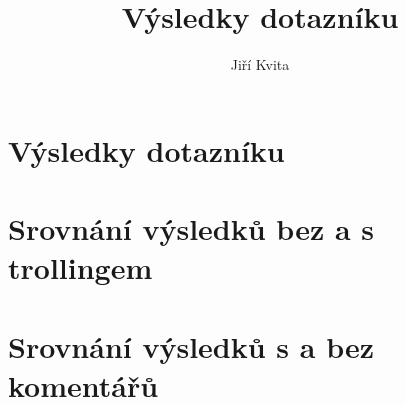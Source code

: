 \documentclass[a4paper,twoside]{article}
\author{Jiří Kvita}
\title{Výsledky dotazníku}
\begin{document}
\tableofcontents

\section{Výsledky dotazníku}







\newpage
\section{Srovnání výsledků bez a s trollingem}



\newpage
\section{Srovnání výsledků s a bez komentářů}


\end{document}
